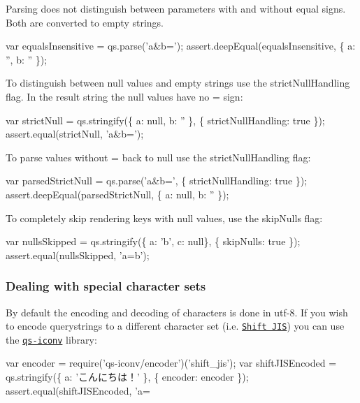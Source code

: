 Parsing does not distinguish between parameters with and without equal signs. Both are converted to empty strings.


\begin{DoxyCode}
var equalsInsensitive = qs.parse('a&b=');
assert.deepEqual(equalsInsensitive, \{ a: '', b: '' \});
\end{DoxyCode}


To distinguish between {\ttfamily null} values and empty strings use the {\ttfamily strict\+Null\+Handling} flag. In the result string the {\ttfamily null} values have no {\ttfamily =} sign\+:


\begin{DoxyCode}
var strictNull = qs.stringify(\{ a: null, b: '' \}, \{ strictNullHandling: true \});
assert.equal(strictNull, 'a&b=');
\end{DoxyCode}


To parse values without {\ttfamily =} back to {\ttfamily null} use the {\ttfamily strict\+Null\+Handling} flag\+:


\begin{DoxyCode}
var parsedStrictNull = qs.parse('a&b=', \{ strictNullHandling: true \});
assert.deepEqual(parsedStrictNull, \{ a: null, b: '' \});
\end{DoxyCode}


To completely skip rendering keys with {\ttfamily null} values, use the {\ttfamily skip\+Nulls} flag\+:


\begin{DoxyCode}
var nullsSkipped = qs.stringify(\{ a: 'b', c: null\}, \{ skipNulls: true \});
assert.equal(nullsSkipped, 'a=b');
\end{DoxyCode}


\subsubsection*{Dealing with special character sets}

By default the encoding and decoding of characters is done in {\ttfamily utf-\/8}. If you wish to encode querystrings to a different character set (i.\+e. \href{https://en.wikipedia.org/wiki/Shift_JIS}{\tt Shift J\+IS}) you can use the \href{https://github.com/martinheidegger/qs-iconv}{\tt {\ttfamily qs-\/iconv}} library\+:


\begin{DoxyCode}
var encoder = require('qs-iconv/encoder')('shift\_jis');
var shiftJISEncoded = qs.stringify(\{ a: 'こんにちは！' \}, \{ encoder: encoder \});
assert.equal(shiftJISEncoded, 'a=%
\end{DoxyCode}


